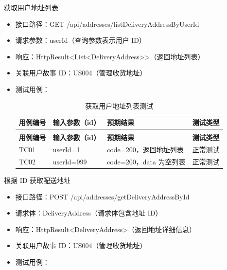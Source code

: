 \begin{levellist}
\begin{levellist}
        \item 获取用户地址列表
        \begin{itemize}
            \item 接口路径：GET /api/addresses/listDeliveryAddressByUserId
            \item 请求参数：userId（查询参数表示用户 ID）
            \item 响应：HttpResult<List<DeliveryAddress>>（返回地址列表）
            \item 关联用户故事 ID：US004（管理收货地址）
            \item 测试用例：
                  \begin{longtable}{>{\centering\arraybackslash}m{2cm} >{\centering\arraybackslash}m{4cm} >{\centering\arraybackslash}m{5cm} >{\centering\arraybackslash}m{2cm}}

                      \caption{获取用户地址列表测试} \label{tab:training}                              \\

                      \toprule
                      \textbf{用例编号} & \textbf{输入参数（id）} & \textbf{预期结果}      & \textbf{测试类型} \\
                      \midrule
                      \endfirsthead

                      \multicolumn{4}{c}{{\tablename\ \thetable{} 续表}}                       \\
                      \toprule
                      \textbf{用例编号} & \textbf{输入参数（id）} & \textbf{预期结果}      & \textbf{测试类型} \\
                      \midrule
                      \endhead

                      \bottomrule
                      \endfoot


                      TC01          & userId=1          & code=200，返回地址列表    & 正常测试          \\
                      TC02          & userId=999        & code=200，data 为空列表 & 正常测试          \\
                  \end{longtable}
        \end{itemize}

        \item 根据 ID 获取配送地址
        \begin{itemize}
            \item 接口路径：POST /api/addresses/getDeliveryAddressById
            \item 请求体：DeliveryAddress（请求体包含地址 ID）
            \item 响应：HttpResult<DeliveryAddress>（返回地址详细信息）
            \item 关联用户故事 ID：US004（管理收货地址）
            \item 测试用例：
                  \begin{longtable}{>{\centering\arraybackslash}m{1.7cm} >{\centering\arraybackslash}m{3cm} >{\centering\arraybackslash}m{6.3cm} >{\centering\arraybackslash}m{2cm}}


\end{longtable}
\end{itemize}
\end{levellist}
\end{levellist}
